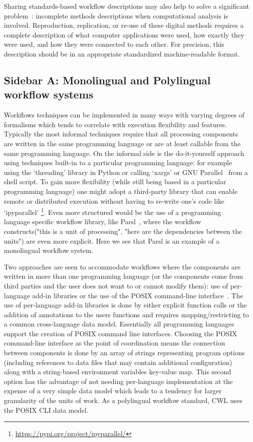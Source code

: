\documentclass[sigconf,authordraft]{acmart}
\begin{document}
Sharing standards-based workflow descriptions may also help to
solve a significant problem~\cite{ivie_reproducibility_2018, feitelson_repeatability_2015}: 
incomplete methods descriptions when computational analysis is involved.
Reproduction, replication, or re-use of these digital methods
requires a complete description of what computer applications were used,
how exactly they were used, and how they were connected to each other.
For precision, this description should be in an appropriate standardized
machine-readable format.

\subsection{Sidebar A: Monolingual and Polylingual workflow systems}

Workflows techniques can be implemented in many ways with varying
degrees of formalisms which tends to correlate with execution
flexibility and features. Typically the most informal techniques require
that all processing components are written in the same programming
language or are at least callable from the same programming language. On
the informal side is the do-it-yourself approach using techniques
built-in to a particular programming language: for example using the
`threading' library in Python or calling `xargs' or GNU Parallel~\cite{tange_gnu_2011} from a shell script. To gain more flexibility (while still
being based in a particular programming language) one might adopt a
third-party library that can enable remote or distributed execution
without having to re-write one's code like
`ipyparallel' \footnote{\url{https://pypi.org/project/ipyparallel/}}.
Even more structured would be the use of a programming language specific
workflow library, like Parsl~\cite{babuji_parsl_2019}, where the workflow constructs("this is a unit of processing", "here are the dependencies between
the units") are even more explicit. Here we see that Parsl is an
example of a monolingual workflow system.

Two approaches are seen to accommodate workflows where the components
are written in more than one programming language (or the components
come from third parties and the user does not want to or cannot
modify them): use of per-language add-in libraries or the use of the
POSIX command-line interface~\cite{the_austin_group_posix1-2008_2008}.
The use of per-language
add-in libraries is done by either explicit function calls or the
addition of annotations to the users functions and requires
mapping/restricting to a common cross-language data model.
Essentially all programming languages support the creation of POSIX
command line interfaces. Choosing the POSIX command-line interface
as the point of coordination means the connection between components
is done by an array of strings representing program options (including
references to data files that may contain additional configuration)
along with a string-based environment variables key-value map. This
second option has the advantage of not needing per-language
implementation at the expense of a very simple data model which leads to
a tendency for larger granularity of the units of work. As a polylingual
workflow standard, CWL uses the POSIX CLI data model.
\end{document}
